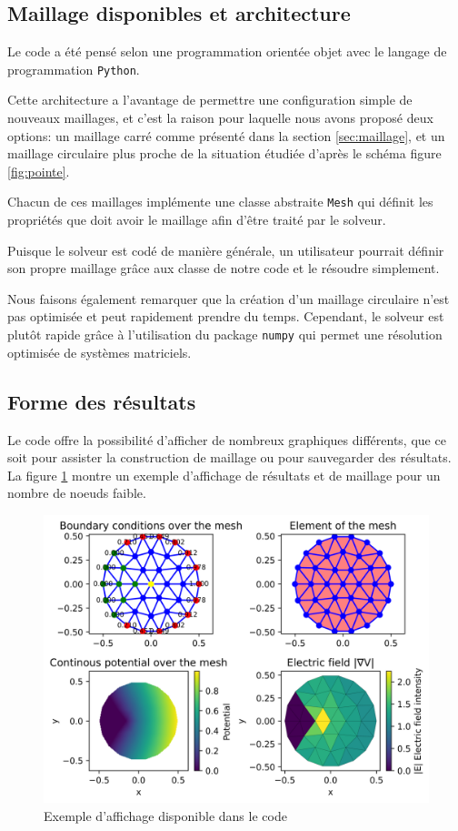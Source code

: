 \documentclass{article}
\begin{document}
\newpage

\subsection{Maillage disponibles et architecture}

Le code a été pensé selon une programmation orientée objet
avec le langage de programmation \verb|Python|.

Cette architecture a l'avantage de permettre une configuration
simple de nouveaux maillages, et c'est la raison pour laquelle
nous avons proposé deux options: un maillage carré comme présenté
dans la section \ref{sec:maillage}, et un maillage circulaire
plus proche de la situation étudiée d'après le schéma
figure \ref{fig:pointe}.

Chacun de ces maillages implémente une classe abstraite
\verb|Mesh| qui définit les propriétés que doit avoir
le maillage afin d'être traité par le solveur.

Puisque le solveur est codé de manière générale, un utilisateur
pourrait définir son propre maillage grâce aux classe de notre
code et le résoudre simplement.

Nous faisons également remarquer que la création d'un maillage
circulaire n'est pas optimisée et peut rapidement prendre du temps.
Cependant, le solveur est plutôt rapide grâce à l'utilisation
du package \verb|numpy| qui permet une résolution optimisée
de systèmes matriciels.


\subsection{Forme des résultats}

Le code offre la possibilité d'afficher de nombreux graphiques
différents, que ce soit pour assister la construction de maillage
ou pour sauvegarder des résultats. La figure \ref{fig:plot_ex}
montre un exemple d'affichage de résultats et de maillage
pour un nombre de noeuds faible.

\begin{figure}[!h]
    \centering
    \includegraphics[width=\textwidth]{img/plot_ex.png}
    \caption{Exemple d'affichage disponible dans le code}
    \label{fig:plot_ex}
\end{figure}
\end{document}
